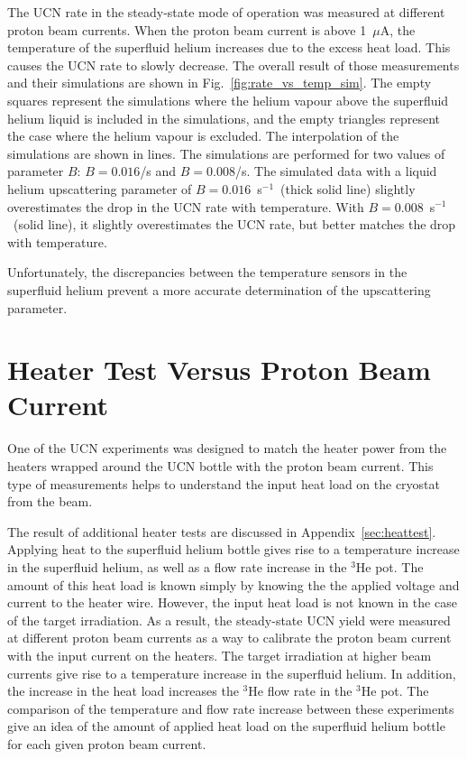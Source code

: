 The UCN rate in the steady-state mode of operation was measured at
different proton beam currents. When the proton beam current is above
1~$\mu$A, the temperature of the superfluid helium increases due to
the excess heat load. This causes the UCN rate to slowly decrease. The
overall result of those measurements and their simulations are shown
in Fig.~\ref{fig:rate_vs_temp_sim}. The empty squares represent the
simulations where the helium vapour above the superfluid helium liquid
is included in the simulations, and the empty triangles represent the
case where the helium vapour is excluded. The interpolation of the
simulations are shown in lines. The simulations are performed for two
values of parameter $B$: $B = 0.016$/s and $B = 0.008$/s. The
simulated data with a liquid helium upscattering parameter of
$B= 0.016$~s$^{-1}$~(thick solid line) slightly overestimates the drop
in the UCN rate with temperature. With $B= 0.008$~s$^{-1}$~(solid
line), it slightly overestimates the UCN rate, but better matches the
drop with temperature.

Unfortunately, the discrepancies between the temperature sensors in
the superfluid helium prevent a more accurate determination of the
upscattering parameter.

\section{Heater Test Versus Proton Beam Current}
One of the UCN experiments was designed to match the heater power from
the heaters wrapped around the UCN bottle with the proton beam
current. This type of measurements helps to understand the input heat
load on the cryostat from the beam.

The result of additional heater tests are discussed in
Appendix~\ref{sec:heattest}. Applying heat to the superfluid helium
bottle gives rise to a temperature increase in the superfluid helium,
as well as a flow rate increase in the $^3$He pot. The amount of this
heat load is known simply by knowing the the applied voltage and
current to the heater wire. However, the input heat load is not known
in the case of the target irradiation. As a result, the steady-state
UCN yield were measured at different proton beam currents as a way to
calibrate the proton beam current with the input current on the
heaters. The target irradiation at higher beam currents give rise to a
temperature increase in the superfluid helium. In addition, the
increase in the heat load increases the $^3$He flow rate in the $^3$He
pot. The comparison of the temperature and flow rate increase between
these experiments give an idea of the amount of applied heat load on
the superfluid helium bottle for each given proton beam current.

